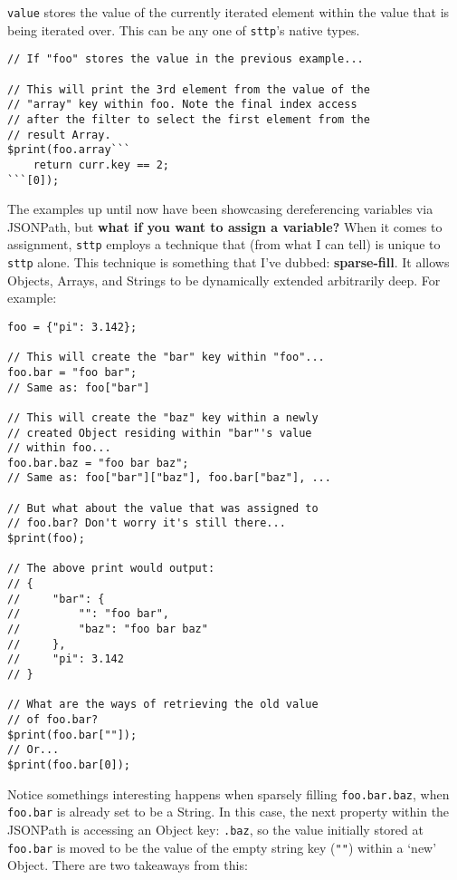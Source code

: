 \verb|value| stores the value of the currently iterated element within the value that is being iterated over. This can be any one of \verb|sttp|'s native types.

\begin{verbatim}
// If "foo" stores the value in the previous example...

// This will print the 3rd element from the value of the
// "array" key within foo. Note the final index access 
// after the filter to select the first element from the
// result Array.
$print(foo.array```
    return curr.key == 2;
```[0]);
\end{verbatim}

The examples up until now have been showcasing dereferencing variables via JSONPath, but \textbf{what if you want to assign a variable?} When it comes to assignment, \verb|sttp| employs a technique that (from what I can tell) is unique to \verb|sttp| alone. This technique is something that I've dubbed: \textbf{sparse-fill}. It allows Objects, Arrays, and Strings to be dynamically extended arbitrarily deep. For example:

\begin{verbatim}
foo = {"pi": 3.142};

// This will create the "bar" key within "foo"...
foo.bar = "foo bar";
// Same as: foo["bar"]

// This will create the "baz" key within a newly
// created Object residing within "bar"'s value
// within foo...
foo.bar.baz = "foo bar baz";
// Same as: foo["bar"]["baz"], foo.bar["baz"], ...

// But what about the value that was assigned to
// foo.bar? Don't worry it's still there...
$print(foo);

// The above print would output:
// {
//     "bar": {
//         "": "foo bar",
//         "baz": "foo bar baz"
//     },
//     "pi": 3.142
// }

// What are the ways of retrieving the old value
// of foo.bar?
$print(foo.bar[""]);
// Or...
$print(foo.bar[0]);
\end{verbatim}

Notice somethings interesting happens when sparsely filling \verb|foo.bar.baz|, when \verb|foo.bar| is already set to be a String. In this case, the next property within the JSONPath is accessing an Object key: \verb|.baz|, so the value initially stored at \verb|foo.bar| is moved to be the value of the empty string key (\verb|""|) within a `new' Object. There are two takeaways from this:

